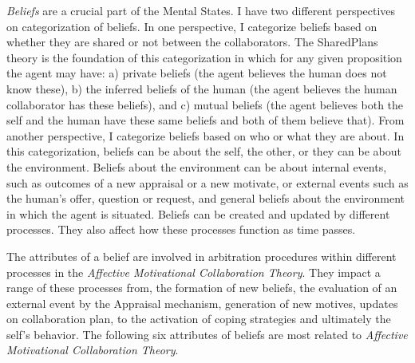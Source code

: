 \documentclass[letterpaper]{article}
\begin{document}
\textit{Beliefs} are a crucial part of the Mental States. I have two different
perspectives on categorization of beliefs. In one perspective, I categorize
beliefs based on whether they are shared or not between the collaborators. The
SharedPlans \cite{grosz:plans-discourse} theory is the foundation of this
categorization in which for any given proposition the agent may have: a) private
beliefs (the agent believes the human does not know these), b) the inferred
beliefs of the human (the agent believes the human collaborator has these
beliefs), and c) mutual beliefs (the agent believes both the self and the human
have these same beliefs and both of them believe that). From another
perspective, I categorize beliefs based on who or what they are about. In this
categorization, beliefs can be about the self, the other, or they can be about
the environment. Beliefs about the environment can be about internal events,
such as outcomes of a new appraisal or a new motivate, or external events such
as the human's offer, question or request, and general beliefs about the
environment in which the agent is situated. Beliefs can be created and updated
by different processes. They also affect how these processes function as time
passes.

The attributes of a belief are involved in arbitration procedures within
different processes in the \textit{Affective Motivational Collaboration Theory}.
They impact a range of these processes from, the formation of new beliefs, the
evaluation of an external event by the Appraisal mechanism, generation of new
motives, updates on collaboration plan, to the activation of coping strategies
and ultimately the self's behavior. The following six attributes of beliefs
are most related to \textit{Affective Motivational Collaboration Theory}.
\end{document}
